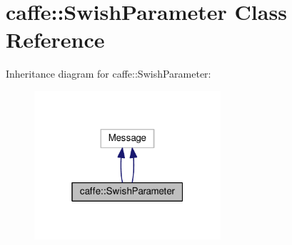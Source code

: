 \hypertarget{classcaffe_1_1_swish_parameter}{}\section{caffe\+:\+:Swish\+Parameter Class Reference}
\label{classcaffe_1_1_swish_parameter}


Inheritance diagram for caffe\+:\+:Swish\+Parameter\+:
\nopagebreak
\begin{figure}[H]
\begin{center}
\leavevmode
\includegraphics[width=196pt]{classcaffe_1_1_swish_parameter__inherit__graph}
\end{center}
\end{figure}
